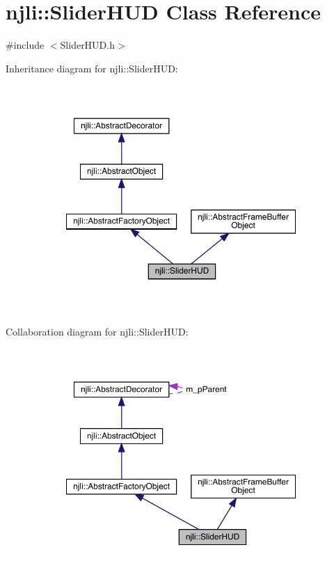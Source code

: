 \hypertarget{classnjli_1_1_slider_h_u_d}{}\section{njli\+:\+:Slider\+H\+UD Class Reference}
\label{classnjli_1_1_slider_h_u_d}


{\ttfamily \#include $<$Slider\+H\+U\+D.\+h$>$}



Inheritance diagram for njli\+:\+:Slider\+H\+UD\+:\nopagebreak
\begin{figure}[H]
\begin{center}
\leavevmode
\includegraphics[width=350pt]{classnjli_1_1_slider_h_u_d__inherit__graph}
\end{center}
\end{figure}


Collaboration diagram for njli\+:\+:Slider\+H\+UD\+:\nopagebreak
\begin{figure}[H]
\begin{center}
\leavevmode
\includegraphics[width=350pt]{classnjli_1_1_slider_h_u_d__coll__graph}
\end{center}
\end{figure}
